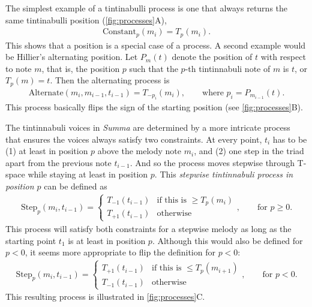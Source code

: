 \documentclass{interact}
\begin{document}
The simplest example of a tintinabulli process is one that always returns the same tintinabulli position (\autoref{fig:processes}A),
%
\begin{align}
    \text{Constant}_p(m_i)
        = T_p(m_i).
\end{align}
%
This shows that a position is a special case of a process. 
A second example would be Hillier's alternating position.
Let $P_m(t)$ denote the position of $t$ with respect to note $m$, that is, the position $p$ such that the $p$-th tintinnabuli note of $m$ is $t$, or $T_p(m) = t$.
Then the alternating process is
%
\begin{align}
    \text{Alternate}(m_i, m_{i-1}, t_{i-1})
        = T_{-p_i}(m_i),
    \qquad \text{where $p_i = P_{m_{i-1}}(t)$}.
\end{align}
%
This process basically flips the sign of the starting position (see \autoref{fig:processes}B).

The tintinnabuli voices in \emph{Summa} are determined by a more intricate process that ensures the voices always satisfy two constraints. 
At every point, $t_i$ has to be (1) at least in position $p$ above the melody note $m_i$, and (2) one step in the triad apart from the previous note $t_{i-1}$.
And so the process moves stepwise through T-space while staying at least in position $p$.
This \emph{stepwise tintinnabuli process in position $p$} can be defined as
%
\begin{align}
    \text{Step}_p(m_i, t_{i-1})
        = \begin{cases}
        T_{-1}( t_{i-1} )  &\text{if this is $\ge T_p(m_{i})$}\\
        T_{+1}( t_{i-1} )  &\text{otherwise}
    \end{cases}, \qquad \text{for $p \ge 0$.}
\end{align}
%
This process will satisfy both constraints for a stepwise melody as long as the starting point $t_1$ is at least in position $p$.
Although this would also be defined for $p<0$, it seems more appropriate to flip the definition for $p<0$:
%
\begin{align}
    \text{Step}_p(m_i, t_{i-1})
        = \begin{cases}
        T_{+1}( t_{i-1} )  &\text{if this is $\le T_p(m_{i+1})$}\\
        T_{-1}( t_{i-1} )  &\text{otherwise}
    \end{cases}, \qquad \text{for $p < 0$}.
\end{align}
%
This resulting process is illustrated in \autoref{fig:processes}C.
\end{document}
